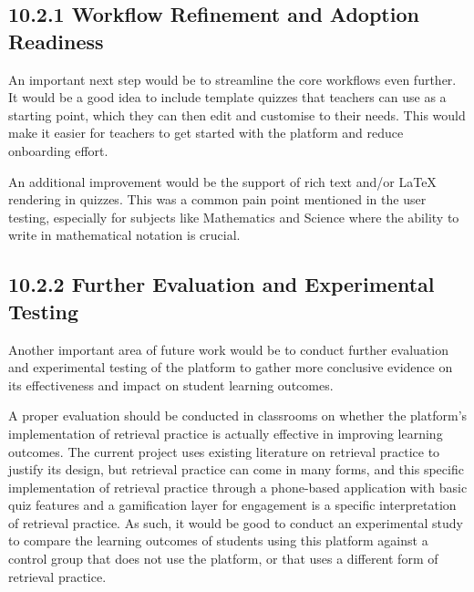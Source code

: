 \documentclass[
  12pt,
  a4paper,
]{report}
\begin{document}
\hypertarget{workflow-refinement-and-adoption-readiness}{%
\subsection{10.2.1 Workflow Refinement and Adoption
Readiness}\label{workflow-refinement-and-adoption-readiness}}

An important next step would be to streamline the core workflows even
further.
It would be a good idea to include template quizzes that teachers can
use as a starting point, which they can then edit and customise to their
needs. This would make it easier for teachers to get started with the platform
and reduce onboarding effort.

An additional improvement would be the support of rich text and/or LaTeX
rendering in quizzes. This was a common pain point mentioned in the user
testing, especially for subjects like Mathematics and Science where the
ability to write in mathematical notation is crucial.

\hypertarget{further-evaluation-and-experimental-testing}{%
\subsection{10.2.2 Further Evaluation and Experimental
Testing}\label{further-evaluation-and-experimental-testing}}

Another important area of future work would be to conduct further
evaluation and experimental testing of the platform to gather more
conclusive evidence on its effectiveness and impact on student learning
outcomes.

A proper evaluation should be conducted in classrooms on whether the
platform's implementation of retrieval practice is actually effective in
improving learning outcomes. The current project uses existing
literature on retrieval practice to justify its design, but retrieval
practice can come in many forms, and this specific implementation of
retrieval practice through a phone-based application with basic quiz
features and a gamification layer for engagement is a specific
interpretation of retrieval practice. As such, it would be good to
conduct an experimental study to compare the learning outcomes of
students using this platform against a control group that does not use
the platform, or that uses a different form of retrieval practice.
\end{document}
